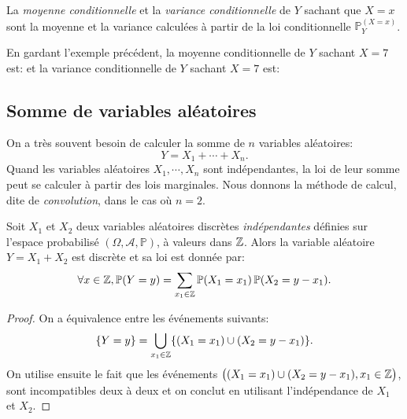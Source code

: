 \begin{definition}
La \emph{moyenne conditionnelle} et la \emph{variance conditionnelle} de $Y$ sachant que $X=x$ sont la moyenne et la variance calculées à partir de la loi conditionnelle $\mathbb{P}_Y^{(X=x)}$. 
\end{definition}

\begin{exemple}
	En gardant l'exemple précédent, la moyenne conditionnelle de $Y$ sachant $X=7$ est:
	 \pl{\rep{1cm}}
	et la variance conditionnelle de $Y$ sachant $X=7$ est:
	 \pl{\rep{1cm}}
\end{exemple}

\sld{\vfill\pagebreak[5]}%
\subsection{Somme de variables aléatoires}

On a très souvent besoin de calculer la somme de $n$ variables aléatoires:
\[ Y=X_1+\cdots+X_n.\]
Quand les variables aléatoires $X_1,\cdots,X_n$ sont indépendantes, la loi de leur somme peut se calculer à partir des lois marginales. Nous donnons la méthode de calcul, dite de \emph{convolution}, dans le cas où $n=2$.

\begin{proposition}
Soit $X_1$ et $X_2$ deux variables aléatoires discrètes \emph{indépendantes} définies sur l'espace probabilisé $(\Omega, \mathcal{A}, \mathbb{P})$, à valeurs dans $\mathbb{Z}$. Alors la variable aléatoire $Y=X_1+X_2$ est discrète et sa loi est donnée par:
\[
\forall x \in  \mathbb{Z}, \mathbb{P} (Y=y) = \sum_{x_1 \in \mathbb{Z}} \mathbb{P} (X_1=x_1) \, \mathbb{P} (X_2=y-x_1). 
\]
\end{proposition}

\begin{proof}
On a équivalence entre les événements suivants:
	\[
	\{Y=y\} = \bigcup_{x_1 \in \mathbb{Z}} \{ (X_1=x_1) \cup (X_2=y-x_1) \} .
\]
On utilise ensuite le fait que les événements $\big( (X_1=x_1) \cup (X_2=y-x_1) , x_1 \in \mathbb{Z} \big)$, sont incompatibles deux à deux et on conclut en utilisant l'indépendance de $X_1$ et $X_2$.
\end{proof}

